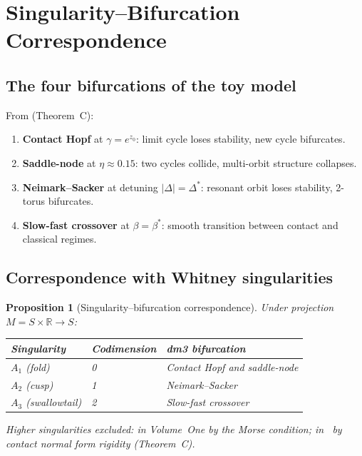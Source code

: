\documentclass[12pt, oneside]{book}
\theoremstyle{plain}
\newtheorem{proposition}[theorem]{Proposition}
\theoremstyle{definition}
\theoremstyle{remark}
\newcommand{\R}{\mathbb{R}}
\begin{document}
\section{Singularity--Bifurcation Correspondence}
\label{sec:bifurcations}

\subsection{The four bifurcations of the toy model}

From \cite{Paper2} (Theorem~C):
\begin{enumerate}[label=(\roman*)]
  \item \textbf{Contact Hopf} at $\gamma=e^{z_0}$: limit cycle
        loses stability, new cycle bifurcates.
  \item \textbf{Saddle-node} at $\eta\approx 0.15$: two cycles
        collide, multi-orbit structure collapses.
  \item \textbf{Neimark--Sacker} at detuning $|\Delta|=\Delta^*$:
        resonant orbit loses stability, 2-torus bifurcates.
  \item \textbf{Slow-fast crossover} at $\beta=\beta^*$: smooth
        transition between contact and classical regimes.
\end{enumerate}

\subsection{Correspondence with Whitney singularities}

\begin{proposition}[Singularity--bifurcation correspondence]
\label{prop:sing-bif}
Under projection $M=S\times\R\to S$:
\begin{center}
\begin{tabular}{lll}
\toprule
Singularity & Codimension & dm3 bifurcation \\
\midrule
$A_1$ (fold) & 0 & Contact Hopf and saddle-node \\
$A_2$ (cusp) & 1 & Neimark--Sacker \\
$A_3$ (swallowtail) & 2 & Slow-fast crossover \\
\bottomrule
\end{tabular}
\end{center}
Higher singularities excluded: in Volume~One by the Morse
condition; in~\cite{Paper1} by contact normal form rigidity
(Theorem~C).
\end{proposition}
\end{document}
